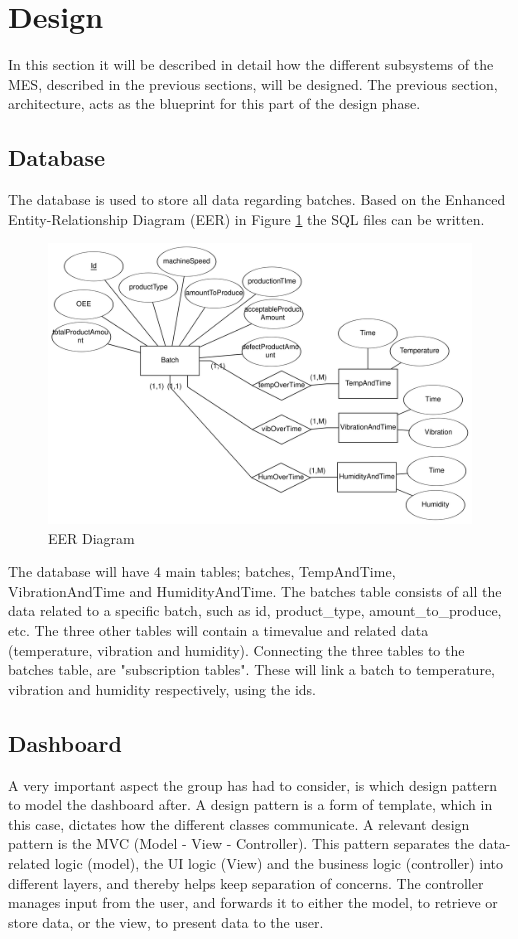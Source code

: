 \section{Design}
In this section it will be described in detail how the different subsystems of
the MES, described in the previous sections, will be designed. The previous
section, architecture, acts as the blueprint for this part of the design phase.

\subsection{Database}
The database is used to store all data regarding batches. Based on the
Enhanced Entity-Relationship Diagram (EER) in Figure \ref{figure:eer_diagram}
the SQL files can be written.

\begin{figure}[ht]
\centering 
\includegraphics[width=0.8\linewidth]{images/eer_diagrams/database_EER_batch.png}
\caption{EER Diagram} 
\label{figure:eer_diagram}
\end{figure}

The database will have 4 main tables; batches, TempAndTime, VibrationAndTime and
HumidityAndTime. The batches table consists of all the data related to a
specific batch, such as id, product\_type, amount\_to\_produce, etc. The three
other tables will contain a timevalue and related data (temperature, vibration
and humidity).
Connecting the three tables to the batches table, are "subscription tables".
These will link a batch to temperature, vibration and humidity respectively,
using the ids.

\subsection{Dashboard}
A very important aspect the group has had to consider, is which design pattern
to model the dashboard after. A design pattern is a form of template, which in
this case, dictates how the different classes communicate. A relevant design
pattern is the MVC (Model - View - Controller). This pattern separates the
data-related logic (model), the UI logic (View) and the business logic 
(controller) into different layers, and thereby helps keep separation of
concerns. The controller manages input from the user, and forwards it to either
the model, to retrieve or store data, or the view, to present data to the user.\\

